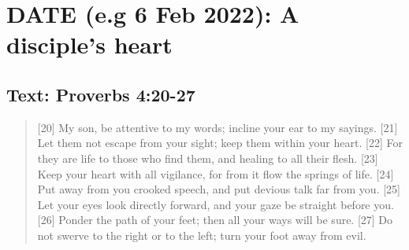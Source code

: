 \section{DATE (e.g 6 Feb 2022): A disciple's heart}
\subsection*{Text: Proverbs 4:20-27}
\begin{quote}
    [20] My son, be attentive to my words;
        incline your ear to my sayings.
    [21] Let them not escape from your sight;
        keep them within your heart.
    [22] For they are life to those who find them,
        and healing to all their flesh.
    [23] Keep your heart with all vigilance,
        for from it flow the springs of life.
    [24] Put away from you crooked speech,
        and put devious talk far from you.
    [25] Let your eyes look directly forward,
        and your gaze be straight before you.
    [26] Ponder the path of your feet;
        then all your ways will be sure.
    [27] Do not swerve to the right or to the left;
        turn your foot away from evil.
\end{quote}
